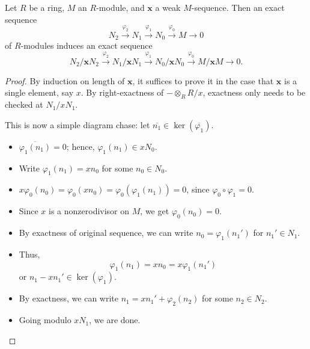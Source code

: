 \documentclass[12pt]{article}
\begin{document}
\begin{prop} \label{prop:regular-sequence-tensor}
	Let $R$ be a ring, $M$ an $R$-module, and $\mathbf{x}$ a weak $M$-sequence. Then an exact sequence
	\begin{equation*} 
		N_{2} \xrightarrow{\varphi_{2}} N_{1} \xrightarrow{\varphi_{1}} N_{0} \xrightarrow{\varphi_{0}} M \to 0
	\end{equation*}
	of $R$-modules induces an exact sequence
	\begin{equation*} 
		N_{2}/\mathbf{x} N_{2} \xrightarrow{\varphi_{2}} N_{1}/\mathbf{x} N_{1} \xrightarrow{\varphi_{1}} N_{0}/\mathbf{x} N_{0} \xrightarrow{\varphi_{0}} M/\mathbf{x} M \to 0.
	\end{equation*}
\end{prop}
\begin{proof} 
	By induction on length of $\mathbf{x}$, it suffices to prove it in the case that $\mathbf{x}$ is a single element, say $x$. By right-exactness of $- \otimes_{R} R/x$, exactness only needs to be checked at $N_{1}/x N_{1}$.

	This is now a simple diagram chase: let $\overline{n_{1}} \in \ker(\overline{\varphi_{1}})$.
	\begin{itemize}
		\item $\overline{\varphi_{1}(n_{1})} = 0$; hence, $\varphi_{1}(n_{1}) \in x N_{0}$.
		\item Write $\varphi_{1}(n_{1}) = x n_{0}$ for some $n_{0} \in N_{0}$. 
		\item $x \varphi_{0}(n_{0}) = \varphi_{0}(x n_{0}) = \varphi_{0}(\varphi_{1}(n_{1})) = 0$, since $\varphi_{0} \circ \varphi_{1} = 0$.
		\item Since $x$ is a nonzerodivisor on $M$, we get $\varphi_{0}(n_{0}) = 0$. 
		\item By exactness of original sequence, we can write $n_{0} = \varphi_{1}(n_{1}')$ for $n_{1}' \in N_{1}$.
		\item Thus,
		\begin{equation*} 
			\varphi_{1}(n_{1}) = x n_{0} = x \varphi_{1}(n_{1}')
		\end{equation*}
		or $n_{1} - x n_{1}' \in \ker(\varphi_{1})$.
		\item By exactness, we can write $n_{1} = x n_{1}' + \varphi_{2}(n_{2})$ for some $n_{2} \in N_{2}$.
		\item Going modulo $x N_{1}$, we are done. \qedhere
	\end{itemize}
\end{proof}
\end{document}
